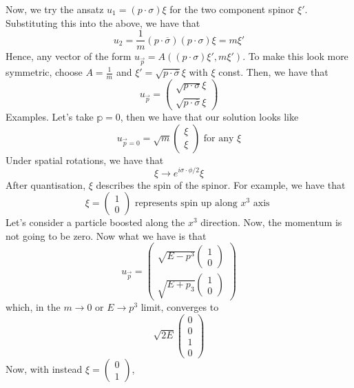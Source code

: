 Now, we try the ansatz $ u _ 1 = ( p \cdot  \sigma ) \xi $ for the 
two component spinor $ \xi ' $. 
Substituting this into the above, 
we have that 
\[
	u _ 2 = \frac{1}{m} ( p \cdot  \overline{ \sigma } ) ( p \cdot  \sigma ) \xi = m \xi ' 
\] Hence, 
any vector of the form $ u _{ \vec{p} }  = A ( ( p \cdot  \sigma ) \xi ' , m \xi ' ) $. 
To make this look more symmetric, choose $ A = \frac{1}{m } $  and 
$ \xi '  = \sqrt{ p \cdot  \overline{ \sigma } }  \xi $  with $ \xi $ const. 
Then, we have that 
\[
 u _{ \vec{p} }  = \begin{pmatrix}  \sqrt{ p \cdot  \sigma }  \xi \\
 \sqrt{ p \cdot  \overline{ \sigma }   } \xi  \end{pmatrix}  
\]  
Examples. Let's take $ \mathbb{p } = 0$, then we have 
that our solution looks like 
 \[
 u_{ \vec{p} = 0 }  = \sqrt{ m }  \begin{pmatrix}  \xi \\ \xi  \end{pmatrix} \text{ for any } \xi 
\] Under spatial rotations, we have that 
\[
 \xi \to e ^{ i \sigma \cdot  \phi  / 2 } \xi 
\] After quantisation, $ \xi $ describes the spin of the spinor. 
For example, we have that 
\[
 \xi = \begin{pmatrix}  1 \\ 0  \end{pmatrix}  \text{ represents spin up along } x ^ 3 \text{ axis }
\] Let's consider a particle boosted along the $ x ^ 3 $ direction. 
Now, the momentum is not going to be zero. 
Now what we have is that 
\[
 u_{ \vec{p} }  = \begin{pmatrix}  \sqrt{ E - p ^ 3 }  \begin{pmatrix}  1 \\ 0  \end{pmatrix} 
 \\ \sqrt{ E + p_3 }  \begin{pmatrix}  1 \\ 0  \end{pmatrix}  \end{pmatrix} 
\] which, in the $ m \to 0 $ or $ E \to p^ 3 $ limit, converges to 
\[
 \sqrt{ 2 E }  \begin{pmatrix}  0 \\ 0 \\ 1 \\ 0  \end{pmatrix} 
\] Now, with instead $ \xi  = \begin{pmatrix}  0 \\ 1  \end{pmatrix}  $, 

